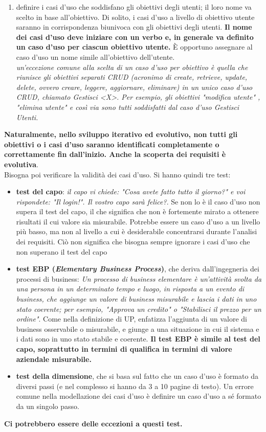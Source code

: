 \documentclass[a4paper,12pt, oneside]{book}
\begin{document}
\begin{enumerate}
\begin{center}
	\end{center}
	\item definire i casi d'uso che soddisfano gli obiettivi degli utenti; il loro nome va scelto in base all'obiettivo. Di solito, i casi d'uso a livello di obiettivo utente saranno in corrispondenza biunivoca con gli obiettivi degli utenti. 
\textbf{Il nome dei casi d'uso deve iniziare con un verbo e, in generale va definito un caso d'uso per ciascun obiettivo utente.} È opportuno assegnare al caso d'uso un nome simile all'obiettivo dell'utente. \\ \textit{un'eccezione comune alla scelta di un caso d'uso per obiettivo è quella che riunisce gli obiettivi separati CRUD (acronimo di create, retrieve, update, delete, ovvero creare, leggere, aggiornare, eliminare) in un unico caso d'uso CRUD, chiamato Gestisci <X>. Per esempio, gli obiettivi "modifica utente" , "elimina utente" e così via sono tutti soddisfatti dal caso d'uso Gestisci Utenti.}
\end{enumerate}
\textbf{Naturalmente, nello sviluppo iterativo ed evolutivo, non tutti gli obiettivi o i casi d'uso
saranno identificati completamente o correttamente fin dall'inizio. Anche la scoperta dei
requisiti è evolutiva}.\\
Bisogna poi verificare la validità dei casi d'uso. Si hanno quindi tre test:
\begin{itemize}
	\item \textbf{test del capo}: \textit{il capo vi chiede: "Cosa avete fatto tutto il giorno?" e voi rispondete: "Il login!". Il vostro capo sarà felice?}. Se non lo è il caso d'uso non supera il test del capo, il che significa che non è fortemente mirato a ottenere risultati il cui valore sia misurabile. Potrebbe essere un caso d'uso a un livello più basso, ma non al livello a cui è desiderabile concentrarsi durante l'analisi dei requisiti. Ciò non significa che bisogna sempre ignorare i casi d'uso che non superano il test del capo
	\item \textbf{test EBP (\textit{Elementary Business Process})}, che deriva dall'ingegneria dei processi di business: \textit{Un processo di business elementare è un'attività svolta da una persona in un determinato tempo e luogo, in risposta a un evento di business, che aggiunge un valore di business misurabile e lascia i dati in uno stato coerente; per esempio, "Approva un credito" o "Stabilisci il prezzo per un ordine"}. Come nella definizione di UP, enfatizza l'aggiunta di un valore di business osservabile o misurabile, e giunge a una situazione in cui il sistema e i dati sono in uno stato stabile e coerente. \textbf{Il test EBP è simile al test del capo, soprattutto in termini di qualifica in termini di valore aziendale misurabile.}
	\item \textbf{test della dimensione}, che si basa sul fatto che un caso d'uso è formato da diversi passi (e nel complesso si hanno da 3 a 10 pagine di testo). Un errore comune nella modellazione dei casi d'uso è definire un caso d'uso a sé formato da un singolo passo.
\end{itemize}
\textbf{Ci potrebbero essere delle eccezioni a questi test.}
\end{document}
